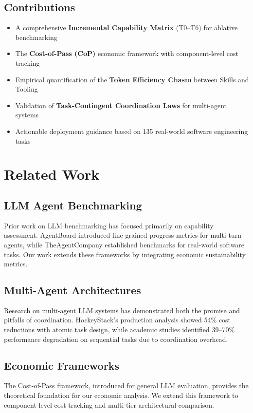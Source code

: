 \documentclass[11pt]{article}
\begin{document}
\subsection{Contributions}
\begin{itemize}
    \item A comprehensive \textbf{Incremental Capability Matrix} (T0--T6) for ablative benchmarking
    \item The \textbf{Cost-of-Pass (CoP)} economic framework with component-level cost tracking
    \item Empirical quantification of the \textbf{Token Efficiency Chasm} between Skills and Tooling
    \item Validation of \textbf{Task-Contingent Coordination Laws} for multi-agent systems
    \item Actionable deployment guidance based on 135 real-world software engineering tasks
\end{itemize}

\section{Related Work}

\subsection{LLM Agent Benchmarking}
Prior work on LLM benchmarking has focused primarily on capability assessment. AgentBoard introduced fine-grained progress metrics for multi-turn agents, while TheAgentCompany established benchmarks for real-world software tasks. Our work extends these frameworks by integrating economic sustainability metrics.

\subsection{Multi-Agent Architectures}
Research on multi-agent LLM systems has demonstrated both the promise and pitfalls of coordination. HockeyStack's production analysis showed 54\% cost reductions with atomic task design, while academic studies identified 39--70\% performance degradation on sequential tasks due to coordination overhead.

\subsection{Economic Frameworks}
The Cost-of-Pass framework, introduced for general LLM evaluation, provides the theoretical foundation for our economic analysis. We extend this framework to component-level cost tracking and multi-tier architectural comparison.
\end{document}

